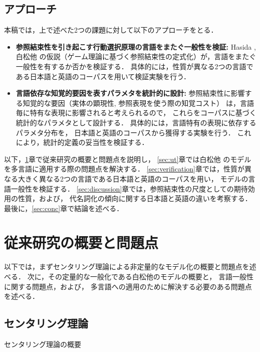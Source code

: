 \documentclass[japanese]{jnlp_1.3e}
\renewcommand{\paragraph}{}
\begin{document}
\subsection{アプローチ}
本稿では，上で述べた2つの課題に対して以下のアプローチをとる．

\begin{itemize}
\item[1.] {\bf 参照結束性を引き起こす行動選択原理の言語をまたぐ一般性を検証: } 
Hasida \citeyear{hasida1995}, 白松他 \citeyear{siramatu2005nlp} の仮説（ゲーム理論に基づく参照結束性の定式化）が，言語をまたぐ一般性を有するか否かを検証する．
具体的には，性質が異なる2つの言語である日本語と英語のコーパスを用いて検証実験を行う．
\item[2.] {\bf 言語依存な知覚的要因を表すパラメタを統計的に設計: } 
参照結束性に影響する知覚的な要因（実体の顕現性, 参照表現を使う際の知覚コスト）
は，言語毎に特有な表現に影響されると考えられるので，
これらをコーパスに基づく統計的なパラメタとして設計する．
具体的には，言語特有の表現に依存するパラメタ分布を，
日本語と英語のコーパスから獲得する実験を行う．
これにより，統計的定義の妥当性を検証する．
\end{itemize}

以下，\ref{sec:issues}章で従来研究の概要と問題点を説明し，
\ref{sec:ut}章では白松他\citeyear{siramatu2005nlp} のモデルを多言語に適用する際の問題点を解決する．
\ref{sec:verification}章では，性質が異なる大きく異なる2つの言語である日本語と英語のコーパスを用い，
モデルの言語一般性を検証する．
\ref{sec:discussion}章では，参照結束性の尺度としての期待効用の性質，および，
代名詞化の傾向に関する日本語と英語の違いを考察する．
最後に，\ref{sec:conc}章で結論を述べる．


\section{従来研究の概要と問題点}
\label{sec:issues}

以下では，まずセンタリング理論による非定量的なモデル化の概要と問題点を述べる．
次に，その定量的な一般化である白松他\citeyear{siramatu2005nlp}のモデルの概要と，
言語一般性に関する問題点，および，
多言語への適用のために解決する必要のある問題点を述べる．


\subsection{センタリング理論}

\paragraph{センタリング理論の概要}
\end{document}
